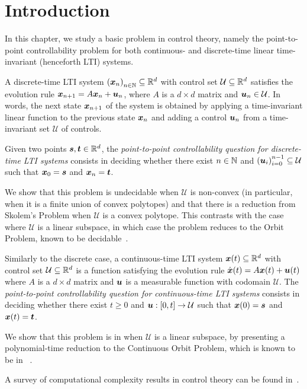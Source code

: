 \section{Introduction}
In this chapter, we study a basic problem in control theory, namely the point-to-point controllability problem for both continuous- and discrete-time linear time-invariant (henceforth LTI) systems.

A discrete-time LTI system ${(\boldsymbol{x}_{n})}_{n \in \mathbb{N}} \subseteq \mathbb{R}^{d}$ with control set $\mathcal{U} \subseteq \mathbb{R}^{d}$ satisfies the evolution rule $\boldsymbol{x}_{n+1} = A \boldsymbol{x}_{n} + \boldsymbol{u}_{n}$, where $A$ is a $d \times d$ matrix and $\boldsymbol{u}_{n} \in \mathcal{U}$.
In words, the next state $\boldsymbol{x}_{n+1}$ of the system is obtained by applying a time-invariant linear function to the previous state $\boldsymbol{x}_{n}$ and adding a control $\boldsymbol{u}_{n}$ from a time-invariant set $\mathcal{U}$ of controls.

Given two points $\boldsymbol{s}, \boldsymbol{t} \in \mathbb{R}^{d}$, the \emph{point-to-point controllability question for discrete-time LTI systems} consists in deciding whether there exist $n \in \mathbb{N}$ and ${(\boldsymbol{u}_{i})}_{i=0}^{n-1} \subseteq \mathcal{U}$ such that $\boldsymbol{x}_{0} = \boldsymbol{s}$ and $\boldsymbol{x}_{n} = \boldsymbol{t}$.

We show that this problem is undecidable when $\mathcal{U}$ is non-convex (in particular, when it is a finite union of convex polytopes) and that there is a reduction from Skolem's Problem when $\mathcal{U}$ is a convex polytope. This contrasts with the case where $\mathcal{U}$ is a linear subspace, in which case the problem reduces to the Orbit Problem, known to be decidable~\cite{Harrison}.

Similarly to the discrete case, a continuous-time LTI system $\boldsymbol{x}(t) \subseteq \mathbb{R}^{d}$ with control set $\mathcal{U} \subseteq \mathbb{R}^{d}$ is a function satisfying the evolution rule $\dot{\boldsymbol{x}}(t) = A \boldsymbol{x}(t) + \boldsymbol{u}(t)$
where $A$ is a $d \times d$ matrix and $\boldsymbol{u}$ is a measurable function with codomain $\mathcal{U}$. The \emph{point-to-point controllability question for continuous-time LTI systems} consists in deciding whether there exist $t \geq 0$ and $\boldsymbol{u} : [0,t] \rightarrow \mathcal{U}$ such that $\boldsymbol{x}(0) = \boldsymbol{s}$ and $\boldsymbol{x}(t) = \boldsymbol{t}$.

We show that this problem is in \PTIME{} when $\mathcal{U}$ is a linear subspace, by presenting a polynomial-time reduction to the Continuous Orbit Problem, which is known to be in \PTIME{}~\cite{ContinuousOrbitIPL}.

A survey of computational complexity results in control theory can be found in~\cite{BlondelT00}.
